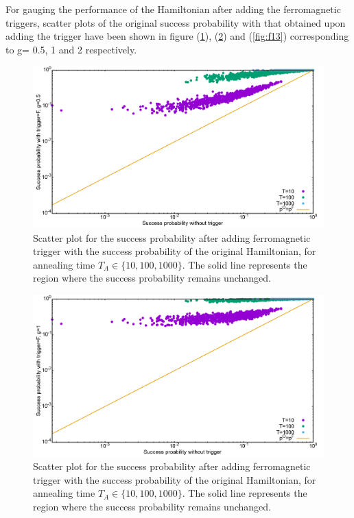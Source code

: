 \documentclass[../main.tex]{subfiles}
\begin{document}
For gauging the performance of the Hamiltonian after adding the ferromagnetic triggers, scatter plots of the original success probability with that obtained upon adding the trigger have been shown in figure (\ref{fig:f11}), (\ref{fig:f12}) and (\ref{fig:f13}) corresponding to g= 0.5, 1 and 2 respectively.
\begin{figure}[H]
\centering 
\includegraphics[scale=0.3]{Scatt_s12_F_g0.png}
\caption{Scatter plot for the success probability after adding ferromagnetic trigger with the success probability of the original Hamiltonian, for annealing time $T_A \in \{10,100,1000\}$. The solid line represents the region where the success probability remains unchanged.}
\label{fig:f11}
\end{figure}
\begin{figure}[H]
\centering
\includegraphics[scale=0.3]{Scatt_s12_F_g1.png}
\caption{Scatter plot for the success probability after adding ferromagnetic trigger with the success probability of the original Hamiltonian, for annealing time $T_A \in \{10,100,1000\}$. The solid line represents the region where the success probability remains unchanged.}
\label{fig:f12}
\end{figure}
\end{document}
